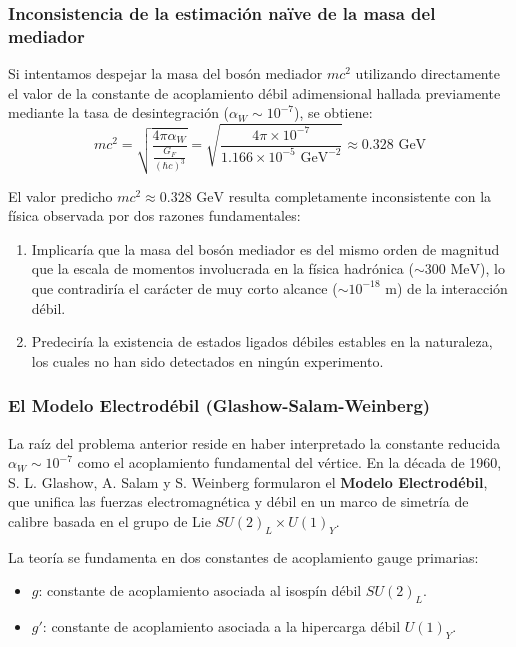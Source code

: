 \newpage
\subsubsection{Inconsistencia de la estimación naïve de la masa del mediador}

Si intentamos despejar la masa del bosón mediador $mc^2$ utilizando directamente el valor de la constante de acoplamiento débil adimensional hallada previamente mediante la tasa de desintegración ($\alpha_W \sim 10^{-7}$), se obtiene:
\begin{equation}
    mc^2 = \sqrt{\frac{4\pi \alpha_W}{\frac{G_F}{(\hbar c)^3}}} = \sqrt{\frac{4\pi \times 10^{-7}}{1.166 \times 10^{-5} \text{ GeV}^{-2}}} \approx 0.328 \text{ GeV}
\end{equation}

\begin{observacion}
El valor predicho $mc^2 \approx 0.328 \text{ GeV}$ resulta completamente inconsistente con la física observada por dos razones fundamentales:
\begin{enumerate}
    \item Implicaría que la masa del bosón mediador es del mismo orden de magnitud que la escala de momentos involucrada en la física hadrónica ($\sim 300 \text{ MeV}$), lo que contradiría el carácter de muy corto alcance ($\sim 10^{-18} \text{ m}$) de la interacción débil.
    \item Predeciría la existencia de estados ligados débiles estables en la naturaleza, los cuales no han sido detectados en ningún experimento.
\end{enumerate}
\end{observacion}

\newpage
\subsubsection{El Modelo Electrodébil (Glashow-Salam-Weinberg)}

La raíz del problema anterior reside en haber interpretado la constante reducida $\alpha_W \sim 10^{-7}$ como el acoplamiento fundamental del vértice. En la década de 1960, S. L. Glashow, A. Salam y S. Weinberg formularon el \textbf{Modelo Electrodébil}, que unifica las fuerzas electromagnética y débil en un marco de simetría de calibre basada en el grupo de Lie $SU(2)_L \times U(1)_Y$.

La teoría se fundamenta en dos constantes de acoplamiento gauge primarias:
\begin{itemize}
    \item $g$: constante de acoplamiento asociada al isospín débil $SU(2)_L$.
    \item $g'$: constante de acoplamiento asociada a la hipercarga débil $U(1)_Y$.
\end{itemize}

